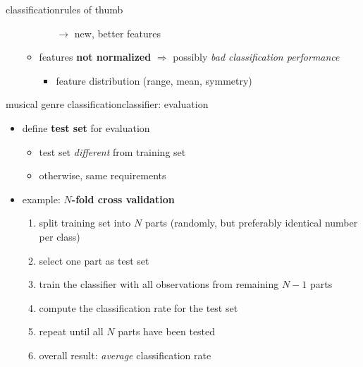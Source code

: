 \begin{frame}{classification}{rules of thumb}
\begin{itemize}
\begin{itemize}
                            \begin{itemize}
                                \item[$\rightarrow$]	new, better features
                            \end{itemize}
                        \item<3->	features \textbf{not normalized} $\Rightarrow$ possibly \textit{bad classification performance}
                            \begin{itemize}
                                \item	feature distribution (range, mean, symmetry)
                            \end{itemize}
                    \end{itemize}
            \end{itemize}
        \end{frame}
        \begin{frame}{musical genre classification}{classifier: evaluation}
            \begin{itemize}
                \item	define \textbf{test set} for evaluation
                    \begin{itemize}
                        \item	test set \textit{different} from training set
                        \item	otherwise, same requirements
                    \end{itemize}
                
                \bigskip
                \item<2->	example: \textbf{$N$-fold cross validation}
                    \begin{enumerate}
                        \item<2->	split training set into $N$ parts (randomly, but preferably identical number per class)
                        \item<3->	select one part as test set
                        \item<4->	train the classifier with all observations from remaining $N-1$ parts
                        \item<5->	compute the classification rate for the test set
                        \item<6->	repeat until all $N$ parts have been tested
                        \item<7->	overall result: \textit{average} classification rate
                    \end{enumerate}
            \end{itemize}
        \end{frame}
        
